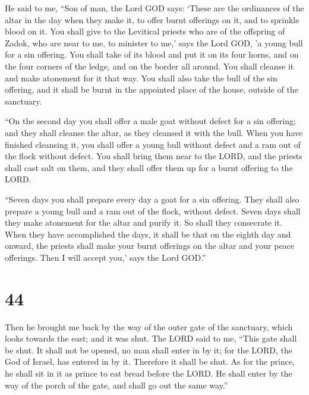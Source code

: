  He said to me, ``Son of man, the Lord GOD says: `These are
the ordinances of the altar in the day when they make it, to offer burnt
offerings on it, and to sprinkle blood on it.  You shall
give to the Levitical priests who are of the offspring of Zadok, who are
near to me, to minister to me,' says the Lord GOD, 'a young bull for a
sin offering.  You shall take of its blood and put it on
its four horns, and on the four corners of the ledge, and on the border
all around. You shall cleanse it and make atonement for it that way.
 You shall also take the bull of the sin offering, and it
shall be burnt in the appointed place of the house, outside of the
sanctuary.

 ``On the second day you shall offer a male goat without
defect for a sin offering; and they shall cleanse the altar, as they
cleansed it with the bull.  When you have finished
cleansing it, you shall offer a young bull without defect and a ram out
of the flock without defect.  You shall bring them near to
the LORD, and the priests shall cast salt on them, and they shall offer
them up for a burnt offering to the LORD.

 ``Seven days you shall prepare every day a goat for a sin
offering. They shall also prepare a young bull and a ram out of the
flock, without defect.  Seven days shall they make
atonement for the altar and purify it. So shall they consecrate it.
 When they have accomplished the days, it shall be that on
the eighth day and onward, the priests shall make your burnt offerings
on the altar and your peace offerings. Then I will accept you,' says the
Lord GOD.''

\hypertarget{section-42}{%
\section{44}\label{section-42}}

 Then he brought me back by the way of the outer gate of the
sanctuary, which looks towards the east; and it was shut. 
The LORD said to me, ``This gate shall be shut. It shall not be opened,
no man shall enter in by it; for the LORD, the God of Israel, has
entered in by it. Therefore it shall be shut.  As for the
prince, he shall sit in it as prince to eat bread before the LORD. He
shall enter by the way of the porch of the gate, and shall go out the
same way.''

